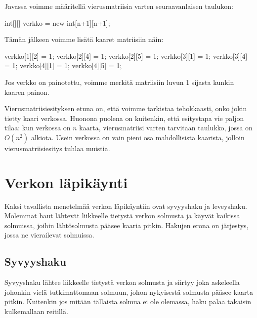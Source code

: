 Javassa voimme määritellä vierusmatriisia varten seuraavanlaisen taulukon:

\begin{code}
int[][] verkko = new int[n+1][n+1];
\end{code}

Tämän jälkeen voimme lisätä kaaret matriisiin näin:

\begin{code}
verkko[1][2] = 1;
verkko[2][4] = 1;
verkko[2][5] = 1;
verkko[3][1] = 1;
verkko[3][4] = 1;
verkko[4][1] = 1;
verkko[4][5] = 1;
\end{code}

Jos verkko on painotettu, voimme merkitä matriisiin luvun 1 sijasta
kunkin kaaren painon.

Vierusmatriisiesityksen etuna on, että voimme tarkistaa tehokkaasti,
onko jokin tietty kaari verkossa.
Huonona puolena on kuitenkin, että esitystapa vie paljon tilaa:
kun verkossa on $n$ kaarta, vierusmatriisi varten tarvitaan taulukko,
jossa on $O(n^2)$ alkiota.
Usein verkossa on vain pieni osa mahdollisista kaarista,
jolloin vierusmatriisiesitys tuhlaa muistia.

\section{Verkon läpikäynti}

Kaksi tavallista menetelmää verkon läpikäyntiin ovat syvyyshaku ja leveyshaku.
Molemmat haut lähtevät liikkeelle tietystä verkon solmusta ja käyvät
kaikissa solmuissa, joihin lähtösolmusta pääsee kaaria pitkin.
Hakujen erona on järjestys, jossa ne vierailevat solmuissa.

\subsection{Syvyyshaku}

Syvyyshaku lähtee liikkeelle tietystä verkon solmusta ja siirtyy
joka askeleella johonkin vielä tutkimattomaan solmuun,
johon nykyisestä solmusta pääsee kaarta pitkin.
Kuitenkin jos mitään tällaista solmua ei ole olemassa,
haku palaa takaisin kulkemallaan reitillä.

